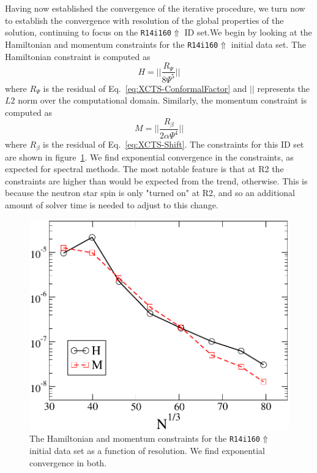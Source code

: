 Having now established the convergence of the iterative procedure, we
turn now to establish the convergence with resolution of the global
properties of the solution, continuing to focus on the {\tt R14i160$\Uparrow$} ID set.We begin by looking at the Hamiltonian and momentum constraints for the {\tt R14i160$\Uparrow$} initial data set.
The Hamiltonian constraint is computed as
\begin{equation}
H=||\frac{R_{\Psi}}{8\Psi^5}||
\end{equation}
where $R_{\Psi}$ is the residual of Eq.~\ref{eq:XCTS-ConformalFactor}
and $||$ represents the $L2$ norm over the computational
domain. Similarly, the momentum constraint is computed as
\begin{equation}
M = ||\frac{R_{\beta}}{2\alpha\Psi^4}||
\end{equation}
where $R_{\beta}$ is the residual of Eq.~\ref{eq:XCTS-Shift}.
The constraints for this ID set are shown in figure~\ref{fig:HamMom}. We find exponential convergence in the constraints, as expected for spectral methods. The most notable feature
is that at {\rm R2} the constraints are higher than would be expected from the trend, otherwise. This is because the neutron star spin is only "turned on" at {\rm R2}, and so an additional amount of
solver time is needed to adjust to this change.
\begin{figure}\includegraphics[width=0.95\columnwidth]{chap4/HamMom}
\caption[Hamiltonian and momentum constraints of the {\tt R14i160$\Uparrow$} ID set]{\label{fig:HamMom} The Hamiltonian and momentum constraints for the {\tt R14i160$\Uparrow$} initial data set
as a function of resolution. We find exponential convergence in both.}
\end{figure}

